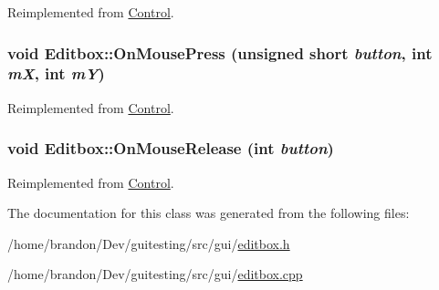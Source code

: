 Reimplemented from \hyperlink{class_control_7be3bcc25d2736d0732e29de40c41b9f}{Control}.\hypertarget{class_editbox_c116bf79fae6dee06d3f65109b8ccc1c}{
\subsubsection[{OnMousePress}]{\setlength{\rightskip}{0pt plus 5cm}void Editbox::OnMousePress (unsigned short {\em button}, \/  int {\em mX}, \/  int {\em mY})}}
\label{class_editbox_c116bf79fae6dee06d3f65109b8ccc1c}




Reimplemented from \hyperlink{class_control_17ebdd745fcaf245f8d8ab38fa534072}{Control}.\hypertarget{class_editbox_3426720f14c8827bc9838f76ff75ebc3}{
\subsubsection[{OnMouseRelease}]{\setlength{\rightskip}{0pt plus 5cm}void Editbox::OnMouseRelease (int {\em button})}}
\label{class_editbox_3426720f14c8827bc9838f76ff75ebc3}




Reimplemented from \hyperlink{class_control_7d95c48b4e3498938e52991e60a89181}{Control}.

The documentation for this class was generated from the following files:\begin{CompactItemize}
\item 
/home/brandon/Dev/guitesting/src/gui/\hyperlink{editbox_8h}{editbox.h}\item 
/home/brandon/Dev/guitesting/src/gui/\hyperlink{editbox_8cpp}{editbox.cpp}\end{CompactItemize}
